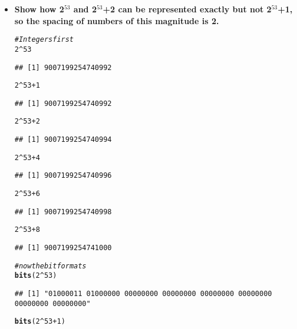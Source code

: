 \documentclass{article}\usepackage[]{graphicx}\usepackage[]{color}
\makeatletter
\newcommand{\hlnum}[1]{\textcolor[rgb]{0.686,0.059,0.569}{#1}}%
\newcommand{\hlcom}[1]{\textcolor[rgb]{0.678,0.584,0.686}{\textit{#1}}}%
\newcommand{\hlopt}[1]{\textcolor[rgb]{0,0,0}{#1}}%
\newcommand{\hlstd}[1]{\textcolor[rgb]{0.345,0.345,0.345}{#1}}%
\newcommand{\hlkwd}[1]{\textcolor[rgb]{0.737,0.353,0.396}{\textbf{#1}}}%
\newenvironment{kframe}{%
 \def\at@end@of@kframe{}%
 \ifinner\ifhmode%
  \def\at@end@of@kframe{\end{minipage}}%
  \begin{minipage}{\columnwidth}%
 \fi\fi%
 \def\FrameCommand##1{\hskip\@totalleftmargin \hskip-\fboxsep
 \colorbox{shadecolor}{##1}\hskip-\fboxsep
     \hskip-\linewidth \hskip-\@totalleftmargin \hskip\columnwidth}%
 \MakeFramed {\advance\hsize-\width
   \@totalleftmargin\z@ \linewidth\hsize
   \@setminipage}}%
 {\par\unskip\endMakeFramed%
 \at@end@of@kframe}
\newenvironment{knitrout}{}{} %
\makeatother
\begin{document}
\begin{itemize}
\item \textbf{Show how 2$^{53}$ and 2$^{53}$+2 can be represented exactly but not 2$^{53}$+1, so the spacing of numbers of this magnitude is 2.}
\begin{knitrout}
\color{fgcolor}\begin{kframe}
\begin{alltt}
\hlcom{#Integers first}
\hlnum{2}\hlopt{^}\hlnum{53}
\end{alltt}
\begin{verbatim}
## [1] 9007199254740992
\end{verbatim}
\begin{alltt}
\hlnum{2}\hlopt{^}\hlnum{53}\hlopt{+}\hlnum{1}
\end{alltt}
\begin{verbatim}
## [1] 9007199254740992
\end{verbatim}
\begin{alltt}
\hlnum{2}\hlopt{^}\hlnum{53}\hlopt{+}\hlnum{2}
\end{alltt}
\begin{verbatim}
## [1] 9007199254740994
\end{verbatim}
\begin{alltt}
\hlnum{2}\hlopt{^}\hlnum{53}\hlopt{+}\hlnum{4}
\end{alltt}
\begin{verbatim}
## [1] 9007199254740996
\end{verbatim}
\begin{alltt}
\hlnum{2}\hlopt{^}\hlnum{53}\hlopt{+}\hlnum{6}
\end{alltt}
\begin{verbatim}
## [1] 9007199254740998
\end{verbatim}
\begin{alltt}
\hlnum{2}\hlopt{^}\hlnum{53}\hlopt{+}\hlnum{8}
\end{alltt}
\begin{verbatim}
## [1] 9007199254741000
\end{verbatim}
\begin{alltt}
\hlcom{#now the bit formats}
\hlkwd{bits}\hlstd{(}\hlnum{2}\hlopt{^}\hlnum{53}\hlstd{)}
\end{alltt}
\begin{verbatim}
## [1] "01000011 01000000 00000000 00000000 00000000 00000000 00000000 00000000"
\end{verbatim}
\begin{alltt}
\hlkwd{bits}\hlstd{(}\hlnum{2}\hlopt{^}\hlnum{53}\hlopt{+}\hlnum{1}\hlstd{)}

\end{alltt}
\end{kframe}
\end{knitrout}
\end{itemize}
\end{document}
